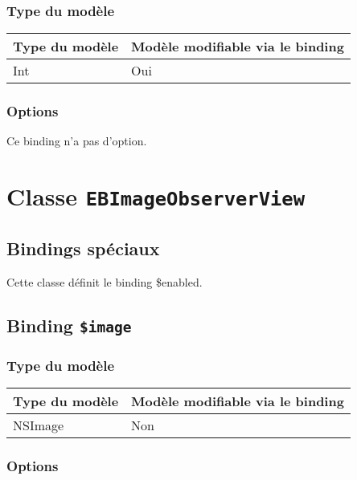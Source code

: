 \subsubsection{Type du modèle}

\begin{tabular}{|l|l|}
\hline
\textbf{Type du modèle} & \textbf{Modèle modifiable via le binding}\\
\hline
Int & Oui\\
\hline
\end{tabular}
\subsubsection{Options}

Ce binding n'a pas d'option.








\section{Classe \texttt{EBImageObserverView}}

\subsection{Bindings spéciaux}

Cette classe définit le binding \$enabled.

\subsection{Binding \texttt{\$image}}

\subsubsection{Type du modèle}

\begin{tabular}{|l|l|}
\hline
\textbf{Type du modèle} & \textbf{Modèle modifiable via le binding}\\
\hline
NSImage & Non\\
\hline
\end{tabular}
\subsubsection{Options}

